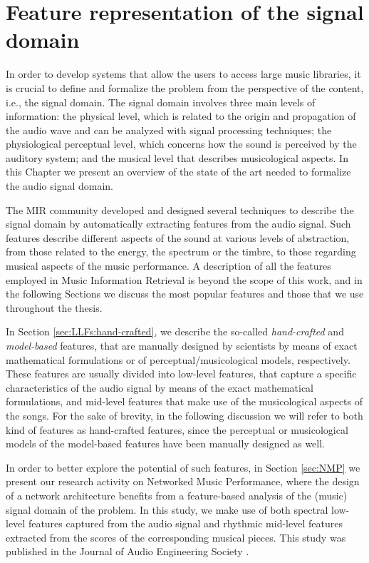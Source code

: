 \chapter{Feature representation of the signal domain}
\label{Chap:LLFs}
In order to develop systems that allow the users to access large music libraries, it is crucial to define and formalize the problem from the perspective of the content, i.e., the signal domain. The signal domain involves three main levels of information: the physical level, which is related to the origin and propagation of the audio wave and can be analyzed with signal processing techniques; the physiological perceptual level, which concerns how the sound is perceived by the auditory system; and the musical level that describes musicological aspects. In this Chapter we  present an overview of the state of the art needed to formalize the audio signal domain.

The MIR community developed and designed several techniques to describe the signal domain by automatically extracting features from the audio signal. Such features describe different aspects of the sound at various levels of abstraction, from those related to the energy, the spectrum or the timbre, to those regarding musical aspects of the music performance. A description of all the features employed in Music Information Retrieval is beyond the scope of this work, and in the following Sections we discuss the most popular features and those that we use throughout the thesis.

In Section \ref{sec:LLFs:hand-crafted}, we describe the so-called \textit{hand-crafted} and \textit{model-based} features, that are manually designed by scientists by means of exact mathematical formulations or of perceptual/musicological models, respectively. These features are usually divided into low-level features, that capture a specific characteristics of the audio signal by means of the exact mathematical formulations, and mid-level features that make use of the musicological aspects of the songs. For the sake of brevity, in the following discussion we will refer to both kind of features as hand-crafted features, since the perceptual or musicological models of the model-based features have been manually designed as well. 

In order to better explore the potential of such features, in Section \ref{sec:NMP} we present our research activity on Networked Music Performance, where the design of a network architecture benefits from a feature-based analysis of the (music) signal domain of the problem. In this study, we make use of both spectral low-level features captured from the audio signal and rhythmic mid-level features extracted from the scores of the corresponding musical pieces. This study was published in the Journal of Audio Engineering Society \cite{Rottondi2015}.

